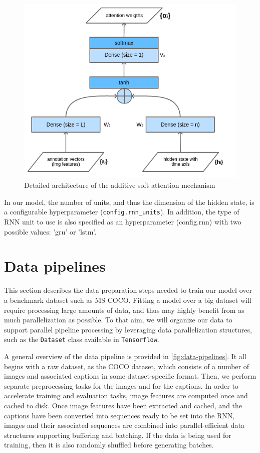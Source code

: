 \begin{figure}[hpt]
	\centering
	\includegraphics[scale=0.6]{images/ch4/attention-architecture.png}
	\caption{Detailed architecture of the additive soft attention mechanism}
	\label{fig:attention-architecture}
\end{figure}

In our model, the number of units, and thus the dimension of the hidden state, is a configurable hyperparameter (\lstinline{config.rnn_units}). In addition, the type of RNN unit to use is also specified as an hyperparameter (config.rnn) with two possible values: 'gru' or 'lstm'.

\section{Data pipelines}

This section describes the data preparation steps needed to train our model over a benchmark dataset such as MS COCO. Fitting a model over a big dataset will require processing large amounts of data, and thus may highly benefit from as much parallelization as possible. To that aim, we will organize our data to support parallel pipeline processing by leveraging data parallelization structures, such as the \lstinline{Dataset} class available in \lstinline{Tensorflow}.

A general overview of the data pipeline is provided in \cref{fig:data-pipelines}. It all begins with a raw dataset, as the COCO dataset, which consists of a number of images and associated captions in some dataset-specific format. Then, we perform separate preprocessing tasks for the images and for the captions. In order to accelerate training and evaluation tasks, image features are computed once and cached to disk. Once image features have been extracted and cached, and the captions have been converted into sequences ready to be set into the RNN, images and their associated sequences are combined into parallel-efficient data structures supporting buffering and batching. If the data is being used for training, then it is also randomly shuffled before generating batches.

